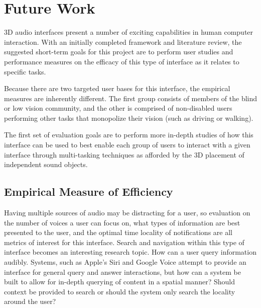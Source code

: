 \newpage                                                  \chapter{Future Work}

3D audio interfaces present a number of exciting capabilities in human computer
interaction. With an initially completed framework and literature review, the
suggested short-term goals for this project are to perform user studies and
performance measures on the efficacy of this type of interface as it relates to
specific tasks.

Because there are two targeted user bases for this interface, the empirical
measures are inherently different. The first group consists of members of the
blind or low vision community, and the other is comprised of non-disabled users
performing other tasks that monopolize their vision (such as driving or
walking).

The first set of evaluation goals are to perform more in-depth studies of
how this interface can be used to best enable each group of users to interact
with a given interface through multi-tasking techniques as afforded by the 3D
placement of independent sound objects.

\section{                 Empirical Measure of Efficiency                    }

Having multiple sources of audio may be distracting for a user, so evaluation on
the number of voices a user can focus on, what types of information are best
presented to the user, and the optimal time locality of notifications are all
metrics of interest for this interface. Search and navigation within this type
of interface becomes an interesting research topic. How can a user query
information audibly. Systems, such as Apple’s Siri and Google Voice attempt
to provide an interface for general query and answer interactions, but how can
a system be built to allow for in-depth querying of content in a spatial manner?
Should context be provided to search or should the system only search the
locality around the user?

